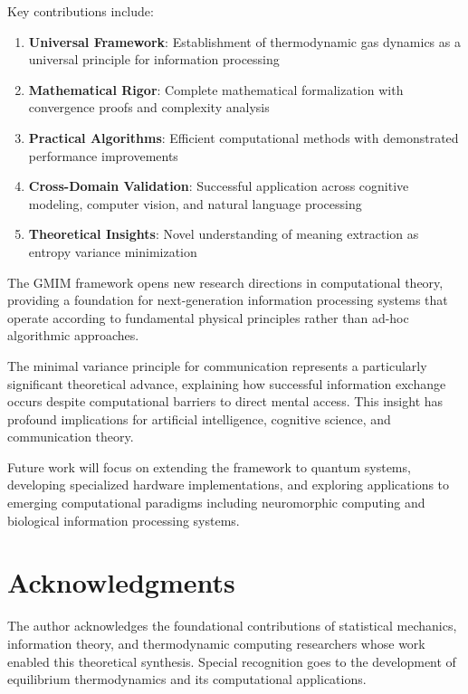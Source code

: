 \documentclass[11pt,a4paper]{article}
\begin{document}
Key contributions include:

\begin{enumerate}
\item \textbf{Universal Framework}: Establishment of thermodynamic gas dynamics as a universal principle for information processing
\item \textbf{Mathematical Rigor}: Complete mathematical formalization with convergence proofs and complexity analysis
\item \textbf{Practical Algorithms}: Efficient computational methods with demonstrated performance improvements
\item \textbf{Cross-Domain Validation}: Successful application across cognitive modeling, computer vision, and natural language processing
\item \textbf{Theoretical Insights}: Novel understanding of meaning extraction as entropy variance minimization
\end{enumerate}

The GMIM framework opens new research directions in computational theory, providing a foundation for next-generation information processing systems that operate according to fundamental physical principles rather than ad-hoc algorithmic approaches.

The minimal variance principle for communication represents a particularly significant theoretical advance, explaining how successful information exchange occurs despite computational barriers to direct mental access. This insight has profound implications for artificial intelligence, cognitive science, and communication theory.

Future work will focus on extending the framework to quantum systems, developing specialized hardware implementations, and exploring applications to emerging computational paradigms including neuromorphic computing and biological information processing systems.

\section*{Acknowledgments}

The author acknowledges the foundational contributions of statistical mechanics, information theory, and thermodynamic computing researchers whose work enabled this theoretical synthesis. Special recognition goes to the development of equilibrium thermodynamics and its computational applications.


\end{document}
